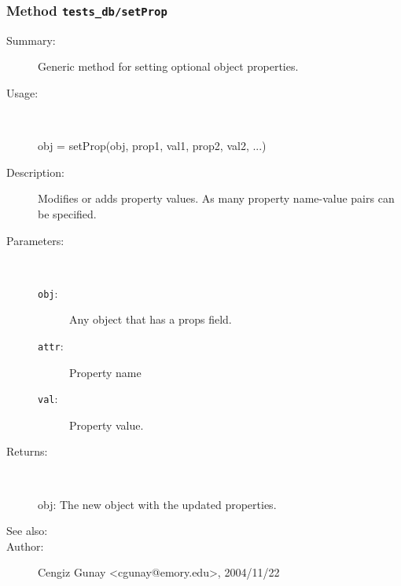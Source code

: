 \subsubsection[Method \texttt{setProp}]{Method \texttt{tests\_db/setProp}}%
%
\label{ref_tests_db__setProp}%
\hypertarget{ref_tests_db__setProp}{}%
\begin{description}
\item[Summary:]Generic method for setting optional object properties.
%
\item[Usage:]~%
\begin{lyxcode}%
obj = setProp(obj, prop1, val1, prop2, val2, ...)
%
\end{lyxcode}%
%
\item[Description:]%
Modifies or adds property values. As many property name-value 
 pairs can be specified.
\item[Parameters:]~
\begin{description}%
\item[\texttt{obj}:]
 Any object that has a props field.
\item[\texttt{attr}:]
 Property name
\item[\texttt{val}:]
 Property value.
\end{description}%
%
\item[Returns:]~

	obj: The new object with the updated properties.
%
%
\item[See also:]%
%
\item[Author:]%
Cengiz Gunay <cgunay@emory.edu>, 2004/11/22%
\end{description}
\methodline%
